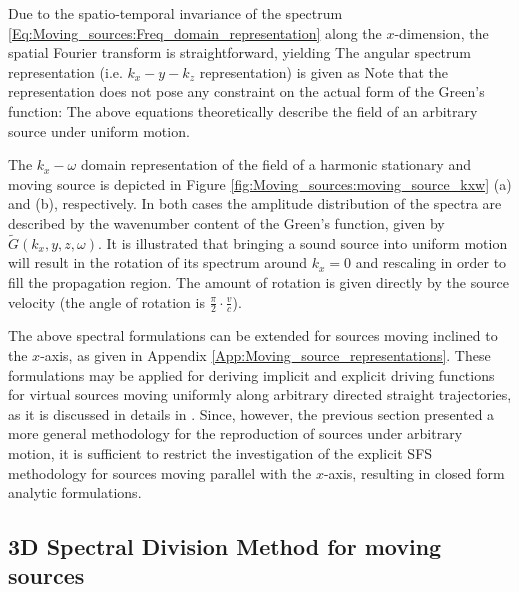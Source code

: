 \vspace{3mm}
Due to the spatio-temporal invariance of the spectrum \eqref{Eq:Moving_sources:Freq_domain_representation} along the $x$-dimension, the spatial Fourier transform is straightforward, yielding
The angular spectrum representation (i.e. $k_x-y-k_z$ representation) is given as
Note that the representation does not pose any constraint on the actual form of the Green's function: The above equations theoretically describe the field of an arbitrary source under uniform motion.	

The $k_x-\omega$ domain representation of the field of a harmonic stationary and moving source is depicted in Figure \ref{fig:Moving_sources:moving_source_kxw} (a) and (b), respectively.
In both cases the amplitude distribution of the spectra are described by the wavenumber content of the Green's function, given by $\tilde{G}(k_x,y,z,\omega)$.
It is illustrated that bringing a sound source into uniform motion will result in the rotation of its spectrum around $k_x = 0$ and rescaling in order to fill the propagation region.
The amount of rotation is given directly by the source velocity (the angle of rotation is $\frac{\pi}{2} \cdot \frac{v}{c}$).

The above spectral formulations can be extended for sources moving inclined to the $x$-axis, as given in Appendix \ref{App:Moving_source_representations}.
These formulations may be applied for deriving implicit and explicit driving functions for virtual sources moving uniformly along arbitrary directed straight trajectories, as it is discussed in details in \cite{firtha2015sound}.
Since, however, the previous section presented a more general methodology for the reproduction of sources under arbitrary motion, it is sufficient to restrict the investigation of the explicit SFS methodology for sources moving parallel with the $x$-axis, resulting in closed form analytic formulations.

\subsection{3D Spectral Division Method for moving sources}

